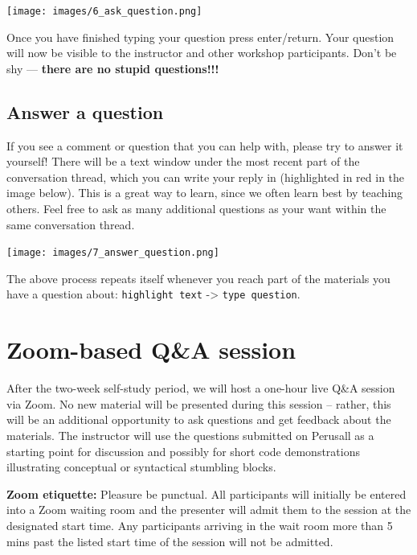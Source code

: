 \documentclass[]{book}
\begin{document}
\texttt{[image: images/6\_ask\_question.png]}

Once you have finished typing your question press enter/return. Your question will now be visible to the instructor and other workshop participants. Don't be shy --- \textbf{there are no stupid questions!!!}

\hypertarget{answer-a-question}{%
\section{Answer a question}\label{answer-a-question}}

If you see a comment or question that you can help with, please try to answer it yourself! There will be a text window under the most recent part of the conversation thread, which you can write your reply in (highlighted in red in the image below). This is a great way to learn, since we often learn best by teaching others. Feel free to ask as many additional questions as your want within the same conversation thread.

\texttt{[image: images/7\_answer\_question.png]}

The above process repeats itself whenever you reach part of the materials you have a question about: \texttt{highlight\ text} -\textgreater{} \texttt{type\ question}.

\hypertarget{zoom-based-qa-session}{%
\chapter*{Zoom-based Q\&A session}\label{zoom-based-qa-session}}

After the two-week self-study period, we will host a one-hour live Q\&A session via Zoom. No new material will be presented during this session -- rather, this will be an additional opportunity to ask questions and get feedback about the materials. The instructor will use the questions submitted on Perusall as a starting point for discussion and possibly for short code demonstrations illustrating conceptual or syntactical stumbling blocks.

\textbf{Zoom etiquette:} Pleasure be punctual. All participants will initially be entered into a Zoom waiting room and the presenter will admit them to the session at the designated start time. Any participants arriving in the wait room more than 5 mins past the listed start time of the session will not be admitted.
\end{document}
